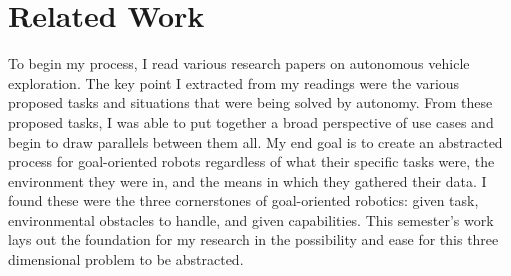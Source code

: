 

\chapter{Related Work}
To begin my process, I read various research papers on autonomous vehicle exploration.
The key point I extracted from my readings were the various proposed tasks and situations that were being solved by autonomy.
From these proposed tasks, I was able to put together a broad perspective of use cases and begin to draw parallels between them all.
My end goal is to create an abstracted process for goal-oriented robots regardless of what their specific tasks were, the environment they were in, and the means in which they gathered their data.
I found these were the three cornerstones of goal-oriented robotics: given task, environmental obstacles to handle, and given capabilities.
This semester’s work lays out the foundation for my research in the possibility and ease for this three dimensional problem to be abstracted.
